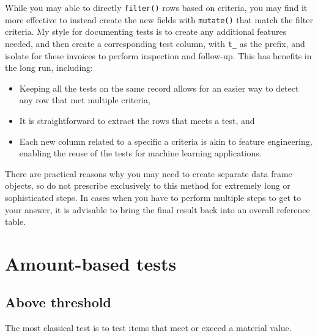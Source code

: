 \documentclass[
]{book}
\newenvironment{Shaded}{\begin{snugshade}}{\end{snugshade}}
\newcommand{\DataTypeTok}[1]{\textcolor[rgb]{0.13,0.29,0.53}{#1}}
\newcommand{\DecValTok}[1]{\textcolor[rgb]{0.00,0.00,0.81}{#1}}
\newcommand{\KeywordTok}[1]{\textcolor[rgb]{0.13,0.29,0.53}{\textbf{#1}}}
\newcommand{\NormalTok}[1]{#1}
\newcommand{\OperatorTok}[1]{\textcolor[rgb]{0.81,0.36,0.00}{\textbf{#1}}}
\newcommand{\StringTok}[1]{\textcolor[rgb]{0.31,0.60,0.02}{#1}}
\providecommand{\tightlist}{%
  \setlength{\itemsep}{0pt}\setlength{\parskip}{0pt}}
\begin{document}
While you may able to directly \texttt{filter()} rows based on criteria, you may find it more effective to instead create the new fields with \texttt{mutate()} that match the filter criteria. My style for documenting tests is to create any additional features needed, and then create a corresponding test column, with \texttt{t\_} as the prefix, and isolate for these invoices to perform inspection and follow-up. This has benefits in the long run, including:

\begin{itemize}
\tightlist
\item
  Keeping all the tests on the same record allows for an easier way to detect any row that met multiple criteria,
\item
  It is straightforward to extract the rows that meets a test, and
\item
  Each new column related to a specific a criteria is akin to feature engineering, enabling the reuse of the tests for machine learning applications.
\end{itemize}

There are practical reasons why you may need to create separate data frame objects, so do not prescribe exclusively to this method for extremely long or sophisticated steps. In cases when you have to perform multiple steps to get to your answer, it is advisable to bring the final result back into an overall reference table.

\hypertarget{amount-based-tests}{%
\section{Amount-based tests}\label{amount-based-tests}}

\hypertarget{above-threshold}{%
\subsection{Above threshold}\label{above-threshold}}

The most classical test is to test items that meet or exceed a material value.

\begin{Shaded}
\end{Shaded}
\end{document}

